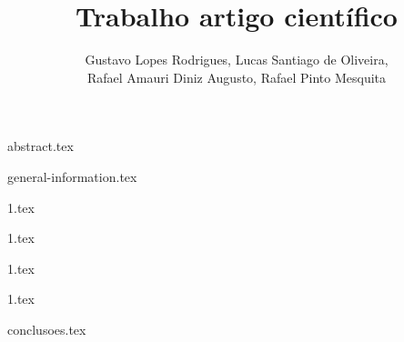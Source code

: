 \documentclass[12pt]{article}
\title{Trabalho artigo científico}
\author{Gustavo Lopes Rodrigues\inst{1}, Lucas Santiago de Oliveira\inst{2}, \\
 Rafael Amauri Diniz Augusto\inst{3}, Rafael Pinto Mesquita\inst{4}}
\begin{document}
 

  \maketitle


  {abstract.tex}


  {general-information.tex}


  {1.tex}


  {1.tex}


  {1.tex}


  {1.tex}


  {conclusoes.tex}


  
  
  
\end{document}
